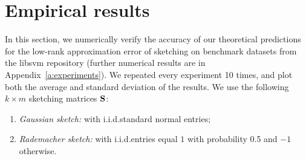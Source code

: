 \documentclass[../../thesis.tex]{subfiles}
\begin{document}

\section{Empirical results}\label{s:experiments}

In this section, we numerically verify the accuracy of our theoretical
predictions for the low-rank approximation error of sketching on
benchmark datasets from the libsvm repository
\citep{libsvm} (further numerical results are in
Appendix~\ref{a:experiments}). We repeated every experiment 10 times,
and plot
both the average and standard deviation of the results. We use the
following $k\times m$ sketching matrices $\S$:\vspace{-1mm}
\begin{enumerate}
  \item \emph{Gaussian sketch:} with i.i.d.\@ standard normal entries;
  \item \emph{Rademacher sketch:} with
        i.i.d.\@ entries equal $1$ with probability 0.5 and $-1$ otherwise.
\end{enumerate}
\vspace{-2mm}
\end{document}
